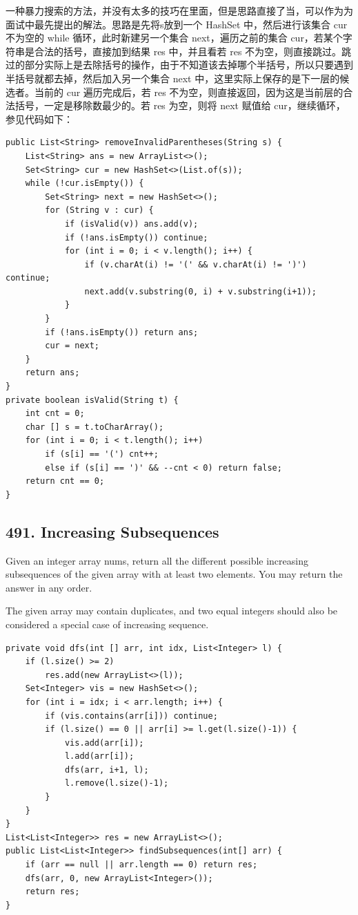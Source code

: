 \documentclass[9pt, b5paaper]{book}
\begin{document}
\begin{enumerate}
一种暴力搜索的方法，并没有太多的技巧在里面，但是思路直接了当，可以作为为面试中最先提出的解法。思路是先将s放到一个 HashSet 中，然后进行该集合 cur 不为空的 while 循环，此时新建另一个集合 next，遍历之前的集合 cur，若某个字符串是合法的括号，直接加到结果 res 中，并且看若 res 不为空，则直接跳过。跳过的部分实际上是去除括号的操作，由于不知道该去掉哪个半括号，所以只要遇到半括号就都去掉，然后加入另一个集合 next 中，这里实际上保存的是下一层的候选者。当前的 cur 遍历完成后，若 res 不为空，则直接返回，因为这是当前层的合法括号，一定是移除数最少的。若 res 为空，则将 next 赋值给 cur，继续循环，参见代码如下：
\begin{verbatim}
public List<String> removeInvalidParentheses(String s) {
    List<String> ans = new ArrayList<>();
    Set<String> cur = new HashSet<>(List.of(s));
    while (!cur.isEmpty()) {
        Set<String> next = new HashSet<>();
        for (String v : cur) {
            if (isValid(v)) ans.add(v);
            if (!ans.isEmpty()) continue;
            for (int i = 0; i < v.length(); i++) {
                if (v.charAt(i) != '(' && v.charAt(i) != ')') continue;
                next.add(v.substring(0, i) + v.substring(i+1));
            }
        }
        if (!ans.isEmpty()) return ans;
        cur = next;
    }
    return ans;
}
private boolean isValid(String t) {
    int cnt = 0;
    char [] s = t.toCharArray();
    for (int i = 0; i < t.length(); i++) 
        if (s[i] == '(') cnt++;
        else if (s[i] == ')' && --cnt < 0) return false;
    return cnt == 0;
}
\end{verbatim}
\end{enumerate}
\subsection{491. Increasing Subsequences}
\label{sec-8-0-8}
Given an integer array nums, return all the different possible increasing subsequences of the given array with at least two elements. You may return the answer in any order.

The given array may contain duplicates, and two equal integers should also be considered a special case of increasing sequence.
\begin{verbatim}
private void dfs(int [] arr, int idx, List<Integer> l) {
    if (l.size() >= 2)
        res.add(new ArrayList<>(l));
    Set<Integer> vis = new HashSet<>();
    for (int i = idx; i < arr.length; i++) {
        if (vis.contains(arr[i])) continue;
        if (l.size() == 0 || arr[i] >= l.get(l.size()-1)) {
            vis.add(arr[i]);
            l.add(arr[i]);
            dfs(arr, i+1, l);
            l.remove(l.size()-1);
        }
    }
}
List<List<Integer>> res = new ArrayList<>();
public List<List<Integer>> findSubsequences(int[] arr) {
    if (arr == null || arr.length == 0) return res;
    dfs(arr, 0, new ArrayList<Integer>());
    return res;
}
\end{verbatim}
\end{document}
